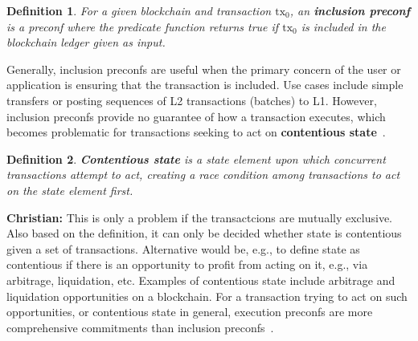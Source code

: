 \documentclass[a4paper]{article}
\theoremstyle{boldstyle}
\newtheorem{definitionx}{Definition}
\newenvironment{definition}
  {\begin{defopenboxq}\begin{definitionx}}
  {\end{definitionx}\end{defopenboxq}}
\newcommand{\ks}[1]{\textcolor{purple}{\textbf{Katerina:} #1}}
\newcommand{\chm}[1]{\textcolor{OliveGreen}{\textbf{Christian:} #1}}
\begin{document}
        \begin{definition}
        For a given blockchain and transaction $\mathrm{tx_0}$, an \textbf{inclusion preconf} is a preconf where the predicate function returns true if $\mathrm{tx_0}$ is included in the blockchain ledger given as input.
        \end{definition}        
        Generally, inclusion preconfs are useful when the primary concern of the user or application is ensuring that the transaction is included. Use cases include simple transfers or posting sequences of L2 transactions (batches) to L1.  
        However, inclusion preconfs provide no guarantee of how a transaction executes, which becomes problematic for transactions seeking to act on \textbf{contentious state}~\cite{W:AnalysingExpectedProposerRevenuefromPreconfirmations,W:APricingModelforInclusionPreconfirmations}. 
        \begin{definition}
        \label{def:contentious state}
        \textbf{Contentious state} is a state element upon which concurrent transactions attempt to act, creating a race condition among transactions to act on the state element first.
        \end{definition}
        \chm{This is only a problem if the transactcions are mutually exclusive. Also based on the definition, it can only be decided whether state is contentious given a set of transactions. Alternative would be, e.g., to define state as contentious if there is an opportunity to profit from acting on it, e.g., via arbitrage, liquidation, etc.}
        Examples of contentious state include arbitrage and liquidation opportunities on a blockchain. For a transaction trying to act on such opportunities, or contentious state in general, execution preconfs are more comprehensive commitments than inclusion preconfs~\cite{W:ATaxonomyofPreconfirmationGuaranteesandTheirSlashingConditionsinRollups}.
\end{document}
